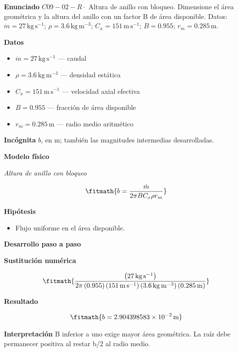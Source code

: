 \documentclass[10pt,openany]{book}
\begin{document}
\begin{tcolorbox}[title={Problema resuelto 2}, studiumworked, breakable]

\noindent\textbf{Enunciado}
\(C09-02-R \cdot\) Altura de anillo con bloqueo. Dimensione el área geométrica y la altura del anillo con un factor B de área disponible. Datos: \(\dot m=27\, \mathrm{kg}\,\mathrm{s}^{-1}\); \(\rho=3.6\, \mathrm{kg}\,\mathrm{m}^{-3}\); \(C_x=151\, \mathrm{m}\,\mathrm{s}^{-1}\); \(B=0.955\); \(r_m=0.285\, \mathrm{m}\).

\noindent\textbf{Datos}
\begin{itemize}
\item $\dot m = 27\,\mathrm{kg}\,\mathrm{s}^{-1}$ — caudal
\item $\rho = 3.6\,\mathrm{kg}\,\mathrm{m}^{-3}$ — densidad estática
\item $C_x = 151\,\mathrm{m}\,\mathrm{s}^{-1}$ — velocidad axial efectiva
\item $B = 0.955$ — fracción de área disponible
\item $r_m = 0.285\,\mathrm{m}$ — radio medio aritmético
\end{itemize}

\noindent\textbf{Incógnita}
$b$, en $\mathrm{m}$; también las magnitudes intermedias desarrolladas.

\noindent\textbf{Modelo físico}

\noindent\textit{Altura de anillo con bloqueo}

\[
\fitmath{b=\frac{\dot m}{2 \pi B C_x \rho r_m}}
\]

\noindent\textbf{Hipótesis}
\begin{itemize}
\item Flujo uniforme en el área disponible.
\end{itemize}

\noindent\textbf{Desarrollo paso a paso}



\noindent\textbf{Sustitución numérica}

\[
\fitmath{\frac{\left(27\,\mathrm{kg}\,\mathrm{s}^{-1}\right)}{2 \pi \left(0.955\right) \left(151\,\mathrm{m}\,\mathrm{s}^{-1}\right) \left(3.6\,\mathrm{kg}\,\mathrm{m}^{-3}\right) \left(0.285\,\mathrm{m}\right)}}
\]

\noindent\textbf{Resultado}

\[
\fitmath{b=2.904398583\times10^{-2}\,\mathrm{m}}
\]

\noindent\textbf{Interpretación}
B inferior a uno exige mayor área geométrica. La raíz debe permanecer positiva al restar b/2 al radio medio.


\end{tcolorbox}
\end{document}
